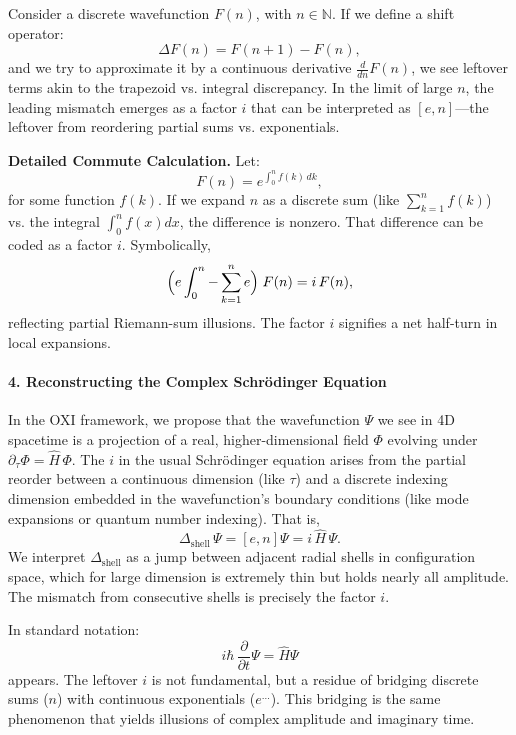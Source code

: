\documentclass{article}
\begin{document}
Consider a discrete wavefunction $F(n)$, with $n\in\mathbb{N}$. If we define a shift operator:
\[
\Delta F(n)=F(n+1)-F(n),
\]
and we try to approximate it by a continuous derivative $\frac{d}{dn}F(n)$, we see leftover terms akin to the trapezoid vs. integral discrepancy. In the limit of large $n$, the leading mismatch emerges as a factor $i$ that can be interpreted as $[e,n]$---the leftover from reordering partial sums vs. exponentials.

\textbf{Detailed Commute Calculation.} Let:
\begin{equation}\label{eq:fn}
F(n)= e^{\int_0^n f(k)\,dk},\end{equation}
for some function $f(k)$. If we expand $n$ as a discrete sum (like $\sum_{k=1}^n f(k)$) vs. the integral $\int_0^n f(x)dx$, the difference is nonzero. That difference can be coded as a factor $i$. Symbolically,
\begin{equation}
\Bigl(e\int_0^n -\sum_{k=1}^n e\Bigr)\;F(n)= i\,F(n),
\end{equation}
reflecting partial Riemann-sum illusions. The factor $i$ signifies a net half-turn in local expansions.

\paragraph{4. Reconstructing the Complex Schr\"odinger Equation}

In the OXI framework, we propose that the wavefunction $\Psi$ we see in 4D spacetime is a projection of a real, higher-dimensional field $\Phi$ evolving under $\partial_\tau\Phi =\hat{H}\,\Phi$. The $i$ in the usual Schr\"odinger equation arises from the partial reorder between a continuous dimension (like $\tau$) and a discrete indexing dimension embedded in the wavefunction’s boundary conditions (like mode expansions or quantum number indexing). That is,
\begin{equation}
\Delta_\text{shell}\,\Psi= [e,n]\Psi = i\,\hat{H}\,\Psi.
\end{equation}
We interpret $\Delta_\text{shell}$ as a jump between adjacent radial shells in configuration space, which for large dimension is extremely thin but holds nearly all amplitude. The mismatch from consecutive shells is precisely the factor $i$.

In standard notation:
\begin{equation}
i\hbar\,\frac{\partial}{\partial t}\Psi=\hat{H}\Psi\end{equation}
appears. The leftover $i$ is not fundamental, but a residue of bridging discrete sums ($n$) with continuous exponentials ($e^{\dots}$). This bridging is the same phenomenon that yields illusions of complex amplitude and imaginary time.
\end{document}
